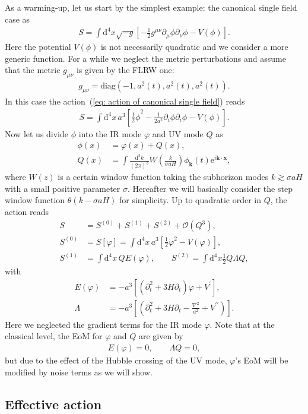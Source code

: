 \documentclass[aps, prd
, preprint
, nofootinbib 
]{revtex4-1}
\newcommand{\dd}{\mathrm{d}}
\newcommand{\ee}{\mathrm{e}}
\newcommand{\diag}{\mathrm{diag}}
\newcommand{\dk}{\frac{\dd^3k}{(2\pi)^3}}
\newcommand{\bae}[1]{\begin{align} #1 \end{align}}
\begin{document}
As a warming-up, let us start by the simplest example: the canonical single field case as
\bae{\label{eq: action of canonical single field}
	S=\int\dd^4x\sqrt{-g}\left[-\frac{1}{2}g^{\mu\nu}\partial_\mu\phi\partial_\nu\phi-V(\phi)\right].
}
Here the potential $V(\phi)$ is not necessarily quadratic and we consider a more generic function.
For a while we neglect the metric perturbations and assume that the metric $g_{\mu\nu}$ is given by the FLRW one:
\bae{
	g_{\mu\nu}=\diag(-1,a^2(t),a^2(t),a^2(t)).
}
In this case the action~(\ref{eq: action of canonical single field}) reads
\bae{
	S=\int\dd^4x\,a^3\left[\frac{1}{2}\dot{\phi}^2-\frac{1}{2a^2}\partial_i\phi\partial_i\phi-V(\phi)\right].
}
Now let us divide $\phi$ into the IR mode $\varphi$ and UV mode $Q$ as
\bae{
	\phi(x)&=\varphi(x)+Q(x), \\
	Q(x)&=\int\dk W\left(\frac{k}{\sigma aH}\right)\phi_\mathbf{k}(t)\ee^{i\mathbf{k}\cdot\mathbf{x}},
}
where $W(z)$ is a certain window function taking the subhorizon modes $k\gtrsim\sigma aH$ 
with a small positive parameter $\sigma$. Hereafter we will basically consider the step window function $\theta(k-\sigma aH)$ for simplicity. 
Up to quadratic order in $Q$, the action reads
\bae{\label{eq: quadratic action in canonical single}
	S&=S^{(0)}+S^{(1)}+S^{(2)}+\mathcal{O}(Q^3), \\
	S^{(0)}&=S[\varphi]=\int\dd^4x\,a^3\left[\frac{1}{2}\dot{\varphi}^2-V(\varphi)\right], \\
	S^{(1)}&=\int\dd^4x\,QE(\varphi), \quad\quad S^{(2)}=\int\dd^4x\frac{1}{2}Q\Lambda Q,
}
with
\bae{
	E(\varphi)&=-a^3\left[\left(\partial_t^2+3H\partial_t\right)\varphi+V^\prime\right], \\
	\Lambda&=-a^3\left[\left(\partial_t^2+3H\partial_t-\frac{\nabla^2}{a^2}+V^{\prime\prime}\right)\right].
}
Here we neglected the gradient terms for the IR mode $\varphi$.
Note that at the classical level, the EoM for $\varphi$ and $Q$ are given by
\bae{
	E(\varphi)=0, \quad\quad \Lambda Q=0,
}
but due to the effect of the Hubble crossing of the UV mode, $\varphi$'s EoM will be modified by noise terms
as we will show.




\subsection{Effective action}
\end{document}
